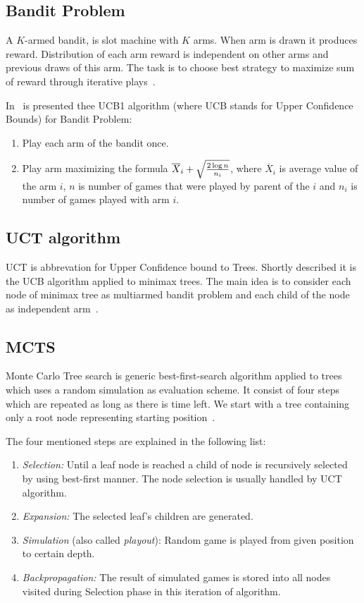 \subsection{Bandit Problem}
A $K$-armed bandit, is slot machine with $K$ arms. When arm is drawn it
produces reward. Distribution of each arm reward is independent on other arms
and previous draws of this arm. The task is to choose best strategy to maximize
sum of reward through iterative plays~\cite{MoGo,MultiarmedBandit}.

In~\cite{MultiarmedBandit} is presented thee UCB1 algorithm (where UCB stands for Upper Confidence Bounds) for Bandit Problem:

\begin{enumerate}
\item Play each arm of the bandit once.
\item Play arm maximizing the formula $\overline X_i + \sqrt{2 \log n \over n_i}$,
	  where $\overline X_i$ is average value of the arm $i$, $n$ is number
	  of games that were played by parent of the $i$ and $n_i$ is number of
	  games played with arm $i$.
\end{enumerate}


\subsection{UCT algorithm}
UCT is abbrevation for  Upper Confidence bound to Trees. Shortly described it
is the UCB algorithm applied to minimax trees. The main idea is to consider
each node of minimax tree as multiarmed bandit problem and each child of the
node as independent arm~\cite{MoGo}.


\subsection{MCTS}
Monte Carlo Tree search is generic best-first-search algorithm applied to
trees which uses a random simulation as evaluation scheme. It consist of four
steps which are repeated as long as there is time left. We start with a tree
containing only a root node representing starting
position~\cite{progressive-strategies,KOZELEK}.

The four mentioned steps are explained in the following list:

\begin{enumerate}
\item \emph{Selection:} Until a leaf node is reached a child of node is
recursively selected by using best-first manner. The node selection is usually
handled by UCT algorithm.
\item \emph{Expansion:} The selected leaf's children are generated.
\item \emph{Simulation} (also called \emph{playout}): Random game is played
from given position to certain depth.
\item \emph{Backpropagation:} The result of simulated games is stored into all
nodes visited during Selection phase in this iteration of algorithm.
\end{enumerate}

